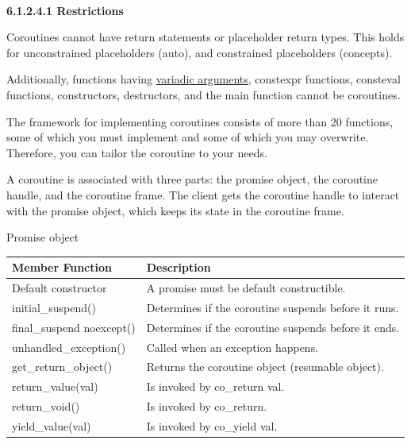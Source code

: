 \hspace*{\fill} \\ %
\noindent
\textbf{6.1.2.4.1 \hspace{0.2cm} Restrictions}

Coroutines cannot have return statements or placeholder return types. This holds for unconstrained placeholders (auto), and constrained placeholders (concepts).

Additionally, functions having \href{https://en.cppreference.com/w/cpp/language/variadic_arguments}{variadic arguments}, constexpr functions, consteval functions, constructors, destructors, and the main function cannot be coroutines.


The framework for implementing coroutines consists of more than 20 functions, some of which you must implement and some of which you may overwrite. Therefore, you can tailor the coroutine to your needs.

A coroutine is associated with three parts: the promise object, the coroutine handle, and the coroutine frame. The client gets the coroutine handle to interact with the promise object, which keeps its state in the coroutine frame.

\begin{center}
Promise object
\end{center}

\begin{table}[H]
\centering
\begin{tabular}{ll}
\textbf{Member Function}  & \textbf{Description}                                 \\ \hline
Default constructor       & A promise must be default constructible.             \\
initial\_suspend()        & Determines if the coroutine suspends before it runs. \\
final\_suspend noexcept() & Determines if the coroutine suspends before it ends. \\
unhandled\_exception()    & Called when an exception happens.                    \\
get\_return\_object()     & Returns the coroutine object (resumable object).     \\
return\_value(val)        & Is invoked by co\_return val.                        \\
return\_void()            & Is invoked by co\_return.                            \\
yield\_value(val)         & Is invoked by co\_yield val.                        
\end{tabular}
\end{table}

